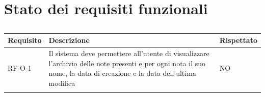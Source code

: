 \documentclass[a4paper,10pt]{article}
\begin{document}
\section{Stato dei requisiti funzionali}
\begin{center}
    \begin{longtable}{|>{\centering\arraybackslash}m{2.5cm}|>{\centering\arraybackslash}m{8cm}|>{\centering\arraybackslash}m{2.5cm}|}
        \hline
        \textbf{Requisito} & \textbf{Descrizione} & \textbf{Rispettato} \\ \hline
        \endfirsthead
        \hline
        RF-O-1 & Il sistema deve permettere all’utente di visualizzare l’archivio delle note presenti e per ogni nota il suo nome, la data di creazione e la data dell’ultima modifica & NO \\ \hline
        \caption{}
    \end{longtable}
\end{center}
\end{document}

